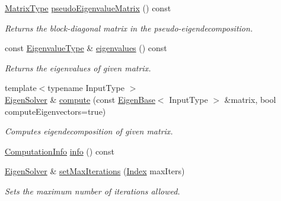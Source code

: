\begin{DoxyCompactItemize}
\hyperlink{group___eigenvalues___module_a83acd180404ddaac8a678fa65a6b632b}{Matrix\+Type} \hyperlink{group___eigenvalues___module_a398ddf36ed919cdbfce7318b379790ca}{pseudo\+Eigenvalue\+Matrix} () const
\begin{DoxyCompactList}\small\item\em Returns the block-\/diagonal matrix in the pseudo-\/eigendecomposition. \end{DoxyCompactList}\item 
const \hyperlink{group___eigenvalues___module_adc446bcb60572758fa64515f2825db62}{Eigenvalue\+Type} \& \hyperlink{group___eigenvalues___module_a114189009e42f5e03372a7a3dfa33b97}{eigenvalues} () const
\begin{DoxyCompactList}\small\item\em Returns the eigenvalues of given matrix. \end{DoxyCompactList}\item 
{\footnotesize template$<$typename Input\+Type $>$ }\\\hyperlink{group___eigenvalues___module_class_eigen_1_1_eigen_solver}{Eigen\+Solver} \& \hyperlink{group___eigenvalues___module_a38d032b75b3e75640e3db42e7ab20c24}{compute} (const \hyperlink{group___core___module_struct_eigen_1_1_eigen_base}{Eigen\+Base}$<$ Input\+Type $>$ \&matrix, bool compute\+Eigenvectors=true)
\begin{DoxyCompactList}\small\item\em Computes eigendecomposition of given matrix. \end{DoxyCompactList}\item 
\hyperlink{group__enums_ga85fad7b87587764e5cf6b513a9e0ee5e}{Computation\+Info} \hyperlink{group___eigenvalues___module_ac4af54fadc33abcdd1778c87bfbf005b}{info} () const
\item 
\mbox{\label{group___eigenvalues___module_a6cff220aadfd8d8c1366b915ddefd164}} 
\hyperlink{group___eigenvalues___module_class_eigen_1_1_eigen_solver}{Eigen\+Solver} \& \hyperlink{group___eigenvalues___module_a6cff220aadfd8d8c1366b915ddefd164}{set\+Max\+Iterations} (\hyperlink{group___eigenvalues___module_a5bff6a6bc0efac67d52c60c2c3deb9ee}{Index} max\+Iters)
\begin{DoxyCompactList}\small\item\em Sets the maximum number of iterations allowed. \end{DoxyCompactList}\item 
\mbox{\label{group___eigenvalues___module_aa7668af4bcb47cd92cfe10640589d88f}} 

\end{DoxyCompactItemize}
